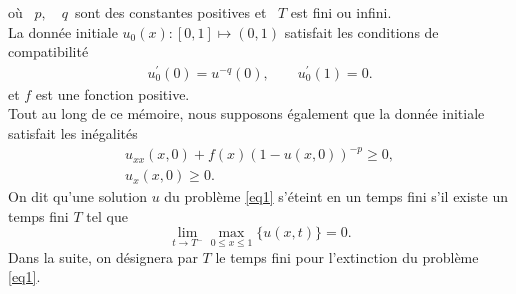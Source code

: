 \documentclass[10pt]{beamer}
\begin{document}
\begin{frame}
    où \ $p,$\ \ $q$\ sont des constantes positives et \ $T$ est fini ou infini.\\
   La donnée initiale $u_{0}(x):[0 ,1]\mapsto(0,1)$  satisfait les conditions de compatibilité 
	\begin{eqnarray*}
		u_{0}^{'}(0)=u^{-q}(0),\qquad u_{0}^{'}(1)=0.
	\end{eqnarray*}
	et $f$ est une fonction positive.\\
	

	Tout au long de ce mémoire, nous supposons également que la donnée initiale  satisfait les inégalités
	 \begin{eqnarray}
		u_{xx}(x,0)+f(x)(1-u(x,0))^{-p}\geq 0,  \label{eq2}\\ 
		u_{x}(x,0)\geq 0.  \label{eq3}
	\end{eqnarray}
  On dit qu'une solution $u$ du problème \eqref{eq1} s'éteint en un temps fini s'il existe un temps fini $T$ tel que
           $$\lim\limits_{t \to T^{-}} \displaystyle \max_{0\leq x\leq 1} \lbrace u(x,t)\rbrace =0.$$
     Dans la suite, on désignera par $T$ le temps fini pour l'extinction du problème \eqref{eq1}.
\end{frame}												 						
\end{document}
